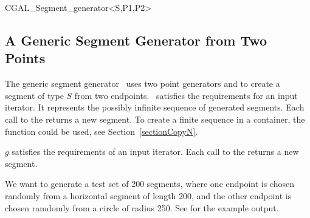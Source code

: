 \begin{ccClassTemplate}{CGAL_Segment_generator<S,P1,P2>}
\subsection{A Generic Segment Generator from Two Points}

\ccDefinition

The generic segment generator \ccClassTemplateName\ uses two point
generators  and  to create a segment of type $S$ from
two endpoints.  \ccClassTemplateName\ satisfies the requirements for
an input iterator. It represents the possibly infinite sequence of
generated segments. Each call to the  returns a new
segment. To create a finite sequence in a container, the function
 could be used, see Section~\ref{sectionCopyN}.


\ccCreation


\ccOperations

$g$ satisfies the requirements of an input iterator. Each call to the
 returns a new segment. 

\ccExample

We want to generate a test set of 200 segments, where one endpoint is
chosen randomly from a horizontal segment of length 200, and the other
endpoint is chosen ramdomly from a circle of radius 250. See
 for the example
output.


\end{ccClassTemplate}
